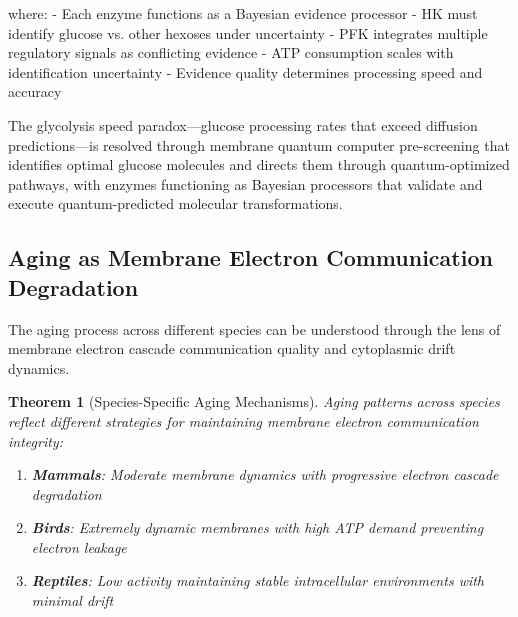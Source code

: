 \documentclass[12pt,a4paper]{article}
\newtheorem{theorem}{Theorem}
\begin{document}
where:
- Each enzyme functions as a Bayesian evidence processor
- HK must identify glucose vs. other hexoses under uncertainty  
- PFK integrates multiple regulatory signals as conflicting evidence
- ATP consumption scales with identification uncertainty
- Evidence quality determines processing speed and accuracy

The glycolysis speed paradox—glucose processing rates that exceed diffusion predictions—is resolved through membrane quantum computer pre-screening that identifies optimal glucose molecules and directs them through quantum-optimized pathways, with enzymes functioning as Bayesian processors that validate and execute quantum-predicted molecular transformations.

\subsection{Aging as Membrane Electron Communication Degradation}

The aging process across different species can be understood through the lens of membrane electron cascade communication quality and cytoplasmic drift dynamics.

\begin{theorem}[Species-Specific Aging Mechanisms]
Aging patterns across species reflect different strategies for maintaining membrane electron communication integrity:
\begin{enumerate}
\item \textbf{Mammals}: Moderate membrane dynamics with progressive electron cascade degradation
\item \textbf{Birds}: Extremely dynamic membranes with high ATP demand preventing electron leakage
\item \textbf{Reptiles}: Low activity maintaining stable intracellular environments with minimal drift
\end{enumerate}
\end{theorem}
\end{document}
